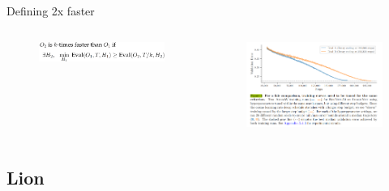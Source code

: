 \documentclass[
	11pt, %
	aspectratio=169, %
]{beamer}
\begin{document}
\begin{frame}{Defining 2x faster }
\begin{columns}[c] %
		\begin{column}{0.45\textwidth} %
			\begin{figure}
				\includegraphics[width=7cm]{figures/2xfaster.png}
			\end{figure}
		\end{column}
		\begin{column}{0.55\textwidth} %
        	\begin{figure}
        	    \centering
                \includegraphics[width=7.5cm]{figures/figure4_dahl_et_al.PNG}
        	\end{figure}
		\end{column}
	\end{columns}
\end{frame}



\subsection{Lion}
\end{document}
